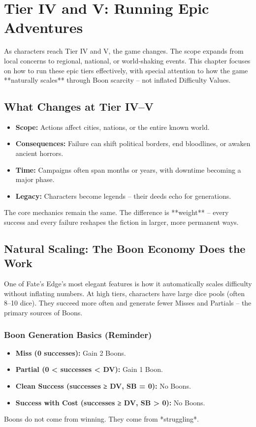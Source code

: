 \chapter{Tier IV and V: Running Epic Adventures}
\label{ch:gm-epic}

As characters reach Tier IV and V, the game changes. The scope expands from local concerns to regional, national, or world‑shaking events. This chapter focuses on how to run these epic tiers effectively, with special attention to how the game **naturally scales** through Boon scarcity – not inflated Difficulty Values.

\section{What Changes at Tier IV–V}

\begin{itemize}
  \item \textbf{Scope:} Actions affect cities, nations, or the entire known world.
  \item \textbf{Consequences:} Failure can shift political borders, end bloodlines, or awaken ancient horrors.
  \item \textbf{Time:} Campaigns often span months or years, with downtime becoming a major phase.
  \item \textbf{Legacy:} Characters become legends – their deeds echo for generations.
\end{itemize}

The core mechanics remain the same. The difference is **weight** – every success and every failure reshapes the fiction in larger, more permanent ways.

\section{Natural Scaling: The Boon Economy Does the Work}

One of Fate’s Edge’s most elegant features is how it automatically scales difficulty without inflating numbers. At high tiers, characters have large dice pools (often 8–10 dice). They succeed more often and generate fewer Misses and Partials – the primary sources of Boons.

\subsection*{Boon Generation Basics (Reminder)}
\begin{itemize}
  \item \textbf{Miss (0 successes):} Gain 2 Boons.
  \item \textbf{Partial (0 < successes < DV):} Gain 1 Boon.
  \item \textbf{Clean Success (successes ≥ DV, SB = 0):} No Boons.
  \item \textbf{Success with Cost (successes ≥ DV, SB > 0):} No Boons.
\end{itemize}
Boons do not come from winning. They come from *struggling*.

